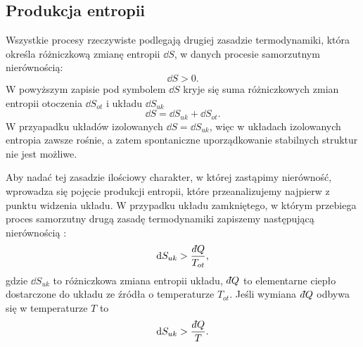 \documentclass[10pt, a4paper, twoside, onecolumn]{article}
\numberwithin{equation}{section}
\newcommand{\dbar}{d\hspace*{-0.08em}\bar{}\hspace*{0.1em}}
\begin{document}
	\subsection{Produkcja entropii}
	Wszystkie procesy rzeczywiste podlegają drugiej zasadzie termodynamiki, która określa różniczkową zmianę entropii \(\dd{S}\), w danych procesie samorzutnym nierównością:
	\begin{equation}\label{II_Zasada_Termodynamiki}
		\dd{S}>0.
	\end{equation}
	W powyższym zapisie pod symbolem \(\dd{S}\) kryje się suma różniczkowych zmian entropii otoczenia \(\dd{S_{ot}}\) i układu \(\dd{S_{uk}}\)
	\begin{equation}\label{entropia_uklad_otoczenie}
		\dd{S}=\dd{S_{uk}}+\dd{S_{ot}}.
	\end{equation}
	W przyapadku układów izolowanych \(\dd{S}=\dd{S_{uk}}\), 
	więc w układach izolowanych entropia zawsze rośnie, a zatem spontaniczne uporządkowanie stabilnych struktur nie jest możliwe. \par
	Aby nadać tej zasadzie ilościowy charakter, w której zastąpimy nierówność, wprowadza się pojęcie produkcji entropii, które przeanalizujemy najpierw z punktu widzenia układu. W przypadku układu zamkniętego, w którym przebiega proces samorzutny drugą zasadę termodynamiki zapiszemy następującą nierównością \cite{orlik, pigon1}: 
	\begin{equation}\label{II_Zasada_Termodynamiki_uklad}
		\dd{S_{uk}}>\frac{\dbar Q}{T_{ot}},
	\end{equation}
	gdzie \(\dd{S_{uk}}\) to różniczkowa zmiana entropii układu, \(\dbar Q\) to elementarne ciepło dostarczone do układu ze źródła o temperaturze \(T_{ot}\). Jeśli wymiana \(\dbar Q\) odbywa się w temperaturze \(T\) to 
	\begin{equation}\label{II_zasada_Termodynamiki_uklad_T}
		\dd{S_{uk}}>\frac{\dbar Q}{T}.
	\end{equation}
	
	
\end{document}
